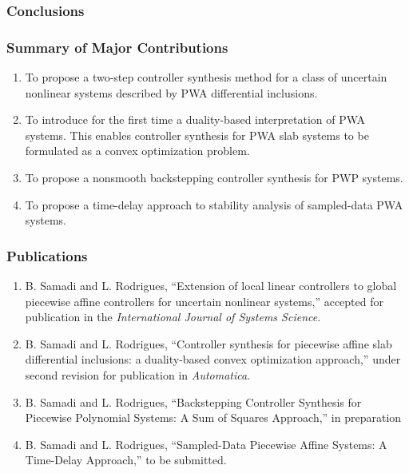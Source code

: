 \documentclass{beamer}
\begin{document}
  \frame
  {
    \frametitle{Conclusions}

    \centerline{}
  }

  \frame
  {
    \frametitle{Summary of Major Contributions}
\begin{enumerate}
\item To propose a two-step controller synthesis method for a class of uncertain nonlinear systems described by PWA differential inclusions.
\item To introduce for the first time a duality-based interpretation of PWA systems. This enables controller synthesis for PWA slab systems to be formulated as a convex optimization problem. 
\item To propose a nonsmooth backstepping controller synthesis for PWP systems. 
\item To propose a time-delay approach to stability analysis of sampled-data PWA systems.
\end{enumerate}
}
  \frame
  {
    \frametitle{Publications}

\begin{enumerate}
\item  B. Samadi and L. Rodrigues, ``Extension of local linear controllers to global piecewise affine controllers for uncertain nonlinear systems,'' accepted for publication in the \emph{International Journal of Systems Science}.
\item  B. Samadi and L. Rodrigues, ``Controller synthesis for piecewise affine slab differential inclusions: a duality-based convex optimization approach,'' under second revision for publication in \emph{Automatica}.
\item B. Samadi and L. Rodrigues, ``Backstepping Controller Synthesis for Piecewise Polynomial Systems: A Sum of Squares Approach,'' in preparation
\item B. Samadi and L. Rodrigues, ``Sampled-Data Piecewise Affine Systems: A Time-Delay Approach,'' to be submitted.
\end{enumerate} 
}
\end{document}
